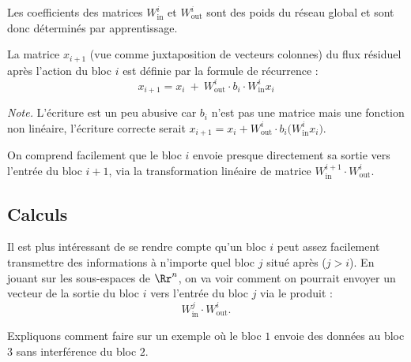 \documentclass[11pt,class=report,crop=false]{standalone}
\begin{document}
Les coefficients des matrices $W_{\text{in}}^i$ et $W_{\text{out}}^i$ sont des poids du réseau global et sont donc déterminés par apprentissage.

La matrice $x_{i+1}$ (vue comme juxtaposition de vecteurs colonnes) du flux résiduel après l'action du bloc $i$ est définie par la formule de récurrence :
$$x_{i+1} = x_i \  + \ W_{\text{out}}^i \cdot b_i \cdot W_{\text{in}}^i x_i$$

\emph{Note.} L'écriture est un peu abusive car $b_i$ n'est pas une matrice mais une fonction non linéaire, l'écriture correcte serait $x_{i+1} = x_i + W_{\text{out}}^i \cdot b_i \big( W_{\text{in}}^i x_i \big)$.


On comprend facilement que le bloc $i$ envoie presque directement sa sortie vers l'entrée du bloc $i+1$, via la transformation linéaire de matrice 
$ W_{\text{in}}^{i+1} \cdot W_{\text{out}}^i$.



\subsection{Calculs}

Il est plus intéressant de se rendre compte qu'un bloc $i$ peut assez facilement transmettre des informations à n'importe quel bloc $j$ situé après ($j > i$).
En jouant sur les sous-espaces de $\Rr^n$, on va voir comment on pourrait envoyer un vecteur de la sortie du bloc $i$ vers l'entrée du bloc $j$ via le produit :
$$W_{\text{in}}^{j} \cdot W_{\text{out}}^i.$$


Expliquons comment faire sur un exemple où le bloc $1$ envoie des données au bloc $3$ sans interférence du bloc $2$.
\end{document}

